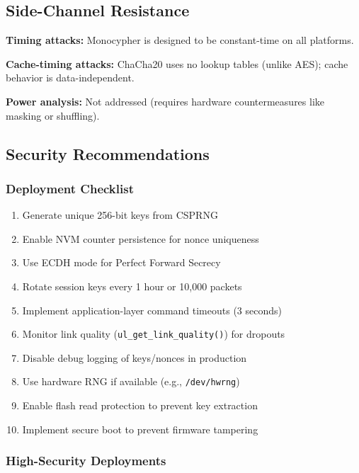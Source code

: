 \documentclass[11pt,a4paper]{article}
\begin{document}
\subsection{Side-Channel Resistance}

\textbf{Timing attacks:} Monocypher is designed to be constant-time on all platforms.

\textbf{Cache-timing attacks:} ChaCha20 uses no lookup tables (unlike AES); cache behavior is data-independent.

\textbf{Power analysis:} Not addressed (requires hardware countermeasures like masking or shuffling).

\subsection{Security Recommendations}

\subsubsection{Deployment Checklist}

\begin{enumerate}[noitemsep]
    \item \checkmark Generate unique 256-bit keys from CSPRNG
    \item \checkmark Enable NVM counter persistence for nonce uniqueness
    \item \checkmark Use ECDH mode for Perfect Forward Secrecy
    \item \checkmark Rotate session keys every 1 hour or 10,000 packets
    \item \checkmark Implement application-layer command timeouts (3 seconds)
    \item \checkmark Monitor link quality (\texttt{ul\_get\_link\_quality()}) for dropouts
    \item \checkmark Disable debug logging of keys/nonces in production
    \item \checkmark Use hardware RNG if available (e.g., \texttt{/dev/hwrng})
    \item \checkmark Enable flash read protection to prevent key extraction
    \item \checkmark Implement secure boot to prevent firmware tampering
\end{enumerate}

\subsubsection{High-Security Deployments}
\end{document}
